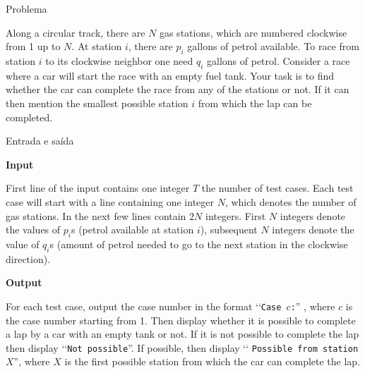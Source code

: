 
\begin{frame}[fragile]{Problema}

Along a circular track, there are $N$ gas stations, which are numbered clockwise from 1 up to $N$. 
At station $i$, there are $p_i$ gallons of petrol available. To race from station $i$ to its 
clockwise neighbor one need $q_i$ gallons of petrol. Consider a race where a car will start the 
race with an empty fuel tank. Your task is to find whether the car can complete the race from any 
of the stations or not. If it can then mention the smallest possible station $i$ from which the 
lap can be completed.

\end{frame}
 
\begin{frame}[fragile]{Entrada e saída}

\textbf{Input}

First line of the input contains one integer $T$ the number of test cases. Each test case will 
start with a line containing one integer $N$, which denotes the number of gas stations. In the 
next few lines contain $2N$ integers. First $N$ integers denote the values of $p_i$s 
(petrol available at station $i$), subsequent $N$ integers denote the value of $q_i$s 
(amount of petrol needed to go to the next station in the clockwise direction).

\textbf{Output}

For each test case, output the case number in the format \lq\lq \texttt{Case $c$:}” , 
where $c$ is the case number starting from 1. Then display whether it is possible to complete a 
lap by a car with an empty tank or not. If it is not possible to complete the lap then display 
\lq\lq \texttt{Not possible}”. If possible, then display \lq\lq 
\texttt{Possible from station $X$}”, where $X$ is the first possible station from which the car 
can complete the lap.

\end{frame}


